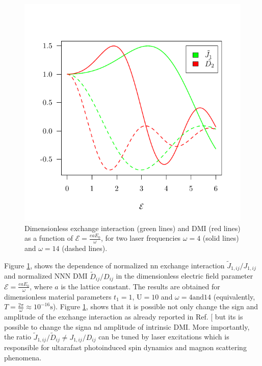 \documentclass[aps,prl,twocolumn,amsmath,amssymb,nobibnotes]{revtex4-1}%
\renewcommand{\cite}[1]{{[}\onlinecite{#1}{]}}
\begin{document}
\begin{figure}[t]
\centering
\vspace{-1.3cm}
\includegraphics[width=\columnwidth]{NNvsNNN1.pdf}
\vspace{-1cm}
\caption{Dimensionless exchange interaction (green lines) and DMI (red lines) as a function of $\mathcal{E} = \frac{eaE_0}{\omega}$, for two laser frequencies $\omega = 4$ (solid lines) and $\omega = 14$ (dashed lines).}
\label{fig2}
\end{figure}

Figure \ref{fig2}, shows the dependence of normalized nn exchange interaction $\tilde{J}_{1,ij}/J_{1,ij}$ and normalized NNN DMI $\tilde{D}_{ij}/D_{ij}$ in the dimensionless electric field parameter $\mathcal{E} = \frac{e a E_0}{\omega}$, where $a$ is the lattice constant. The results are obtained for dimensionless material parameters $t_1=1$, $\text{U} = 10$ and $\omega = 4 \mathrm{and} 14$ (equivalently, $T = \frac{2\pi}{\omega} \approx 10^{-16}\text{s}$). Figure \ref{fig2}, shows that it is possible not only change the sign and amplitude of the exchange interaction as already reported in Ref. \cite{Mentink2015} but its is possible to change the signa nd amplitude of intrinsic DMI. More importantly, the ratio $\tilde{J}_{1,ij}/\tilde{D}_{ij}\neq J_{1,ij}/D_{ij}$ can be tuned by laser excitations which is responsible for ultarafast photoinduced spin dynamics and magnon scattering phenomena.
\end{document}
